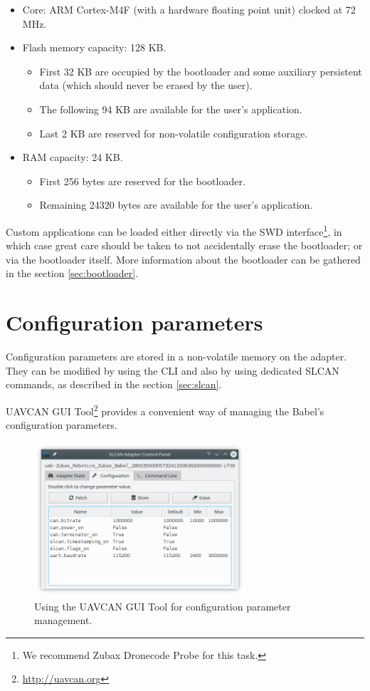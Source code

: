 \documentclass{zubaxdoc}
\begin{document}
\begin{itemize}
    \item Core: ARM Cortex-M4F (with a hardware floating point unit) clocked at 72 MHz.
    \item Flash memory capacity: 128 KB.
    \begin{itemize}
        \item First 32 KB are occupied by the bootloader and some auxiliary persistent data
              (which should never be erased by the user).
        \item The following 94 KB are available for the user's application.
        \item Last 2 KB are reserved for non-volatile configuration storage.
    \end{itemize}
    \item RAM capacity: 24 KB.
    \begin{itemize}
        \item First 256 bytes are reserved for the bootloader.
        \item Remaining 24320 bytes are available for the user's application.
    \end{itemize}
\end{itemize}

Custom applications can be loaded either directly via the
SWD interface\footnote{We recommend Zubax Dronecode Probe for this task.},
in which case great care should be taken to not accidentally erase the bootloader;
or via the bootloader itself.
More information about the bootloader can be gathered in the section \ref{sec:bootloader}.

\chapter{Configuration parameters}\label{sec:configuration_parameters}

Configuration parameters are stored in a non-volatile memory on the adapter.
They can be modified by using the CLI and also by using dedicated SLCAN commands,
as described in the section \ref{sec:slcan}.

UAVCAN GUI Tool\footnote{\url{http://uavcan.org}} provides a convenient way of managing the
Babel's configuration parameters.

\begin{figure}[hbtp]
	\centerline{\includegraphics[width=0.7\textwidth]{uavcan_gui_tool_adapter_configuration}}
	\caption{Using the UAVCAN GUI Tool for configuration parameter management.}
\end{figure}
\end{document}
